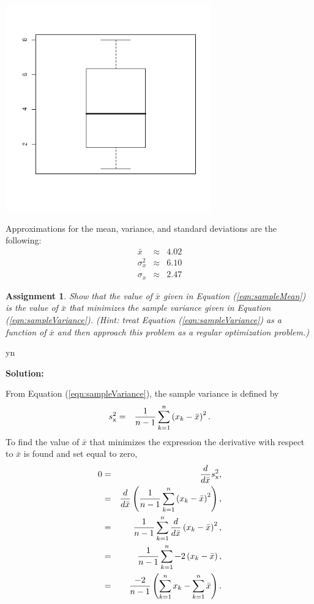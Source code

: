 \documentclass[12pt]{article}
\def\solutions{y}
\def\solutions{n}
\newtheorem{assignment}{Assignment}[section]
\newcommand{\lp}{\left(}
\newcommand{\rp}{\right)}
\begin{document}
\centerline{\includegraphics[width=3.5in]{prob36}}

Approximations for the mean, variance, and standard deviations are the
following:
\begin{eqnarray*}
  \bar{x}    & \approx & 4.02  \\
  \sigma^2_x & \approx & 6.10  \\
  \sigma_x   & \approx & 2.47
\end{eqnarray*}


\fi




\begin{assignment}
  Show that the value of $\bar{x}$ given in Equation
  (\ref{eqn:sampleMean}) is the value of $\bar{x}$ that minimizes the
  sample variance given in Equation (\ref{eqn:sampleVariance}). (Hint:
  treat Equation (\ref{eqn:sampleVariance}) as a function of $\bar{x}$
  and then approach this problem as a regular optimization problem.)
\end{assignment}

\if y\solutions

\textbf{Solution:}

From Equation (\ref{eqn:sampleVariance}), the sample variance is
defined by
  \begin{eqnarray}
    s^2_{\rm x} & = & \frac{1}{n-1} \sum^n_{k=1} \lp x_k - \bar{x} \rp^2.
  \end{eqnarray}
To find the value of $\bar{x}$ that minimizes the expression the
derivative with respect to $\bar{x}$ is found and set equal to zero,
\begin{eqnarray*}
  0 & = & \frac{d}{d \bar{x}} s^2_{\rm x}, \\
  & = & \frac{d}{d \bar{x}} \lp \frac{1}{n-1} \sum^n_{k=1} \lp x_k - \bar{x} \rp^2 \rp, \\
  & = & \frac{1}{n-1} \sum^n_{k=1} \frac{d}{d \bar{x}} \lp x_k - \bar{x} \rp^2, \\
  & = & \frac{1}{n-1} \sum^n_{k=1} -2 \lp x_k - \bar{x} \rp, \\
  & = & \frac{-2}{n-1} \lp \sum^n_{k=1}  x_k - \sum^n_{k=1} \bar{x} \rp.
\end{eqnarray*}
\end{document}

